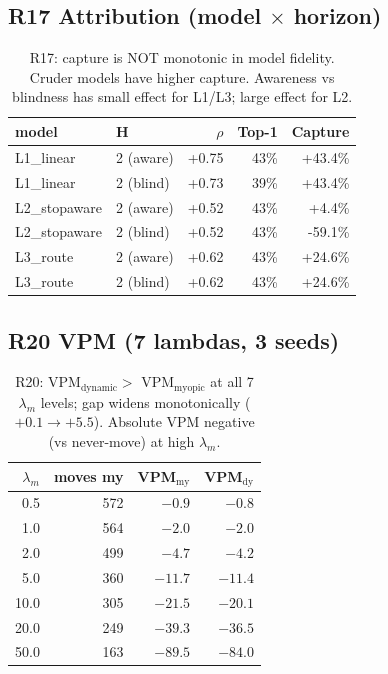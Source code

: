 \documentclass[11pt,a4paper]{article}
\begin{document}
\subsection{R17 Attribution (model $\times$ horizon)}

\begin{table}[H]
\centering
\scriptsize
\begin{tabular}{l l r r r}
\toprule
model & H & $\rho$ & Top-1 & Capture \\
\midrule
L1\_linear    & 2 (aware) & +0.75 & 43\% & +43.4\% \\
L1\_linear    & 2 (blind) & +0.73 & 39\% & +43.4\% \\
L2\_stopaware & 2 (aware) & +0.52 & 43\% & +4.4\% \\
L2\_stopaware & 2 (blind) & +0.52 & 43\% & -59.1\% \\
L3\_route     & 2 (aware) & +0.62 & 43\% & +24.6\% \\
L3\_route     & 2 (blind) & +0.62 & 43\% & +24.6\% \\
\bottomrule
\end{tabular}
\caption{R17: capture is NOT monotonic in model fidelity. Cruder models
have higher capture. Awareness vs blindness has small effect for L1/L3;
large effect for L2. \label{tab:r17}}
\end{table}

\subsection{R20 VPM (7 lambdas, 3 seeds)}

\begin{table}[H]
\centering
\small
\begin{tabular}{r r r r}
\toprule
$\lambda_m$ & moves my & VPM$_{\text{my}}$ & VPM$_{\text{dy}}$ \\
\midrule
0.5  & 572 & $-0.9$  & $\mathbf{-0.8}$  \\
1.0  & 564 & $-2.0$  & $\mathbf{-2.0}$  \\
2.0  & 499 & $-4.7$  & $\mathbf{-4.2}$  \\
5.0  & 360 & $-11.7$ & $\mathbf{-11.4}$ \\
10.0 & 305 & $-21.5$ & $\mathbf{-20.1}$ \\
20.0 & 249 & $-39.3$ & $\mathbf{-36.5}$ \\
50.0 & 163 & $-89.5$ & $\mathbf{-84.0}$ \\
\bottomrule
\end{tabular}
\caption{R20: VPM$_{\text{dynamic}} >$ VPM$_{\text{myopic}}$ at all 7 $\lambda_m$
levels; gap widens monotonically ($+0.1 \to +5.5$). Absolute VPM negative
(vs never-move) at high $\lambda_m$. \label{tab:r20}}
\end{table}
\end{document}
